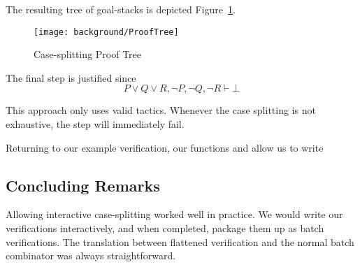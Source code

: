 \vspace{0.5cm}
\begin{minipage}{\linewidth}
  \footnotesize






\end{minipage}
\vspace{0.5cm}

The resulting tree of goal-stacks is depicted Figure~\ref{fig:CaseProofTree}.

\begin{figure}
\begin{center}
\texttt{[image: background/ProofTree]}
\end{center}
\caption{Case-splitting Proof Tree}
\label{fig:CaseProofTree}
\end{figure}

The final  step is justified since
\begin{displaymath}
P \vee Q \vee R, \neg P, \neg Q, \neg R \vdash \bot
\end{displaymath}

This approach only uses valid tactics. Whenever the case splitting is not exhaustive, the  step will immediately fail.

Returning to our example verification, our functions  and  allow us to write

\vspace{0.5cm}
\begin{minipage}{\linewidth}
  \footnotesize






\end{minipage}
\vspace{0.5cm}

\subsection{Concluding Remarks}
Allowing interactive case-splitting worked well in practice. We would write our verifications interactively, and when completed, package them up as batch verifications. The translation between flattened verification and the normal batch  combinator was always straightforward.

